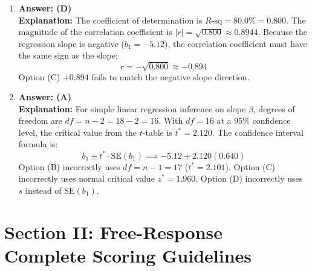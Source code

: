 \begin{enumerate}[leftmargin=1.5em]
  \item \textbf{Answer: (D)} \\
  \textbf{Explanation:} The coefficient of determination is $R\text{-sq} = 80.0\% = 0.800$. The magnitude of the correlation coefficient is $|r| = \sqrt{0.800} \approx 0.8944$. Because the regression slope is negative ($b_1 = -5.12$), the correlation coefficient must have the same sign as the slope:
  \[ r = -\sqrt{0.800} \approx -0.894 \]
  Option (C) $+0.894$ fails to match the negative slope direction.

  \item \textbf{Answer: (A)} \\
  \textbf{Explanation:} For simple linear regression inference on slope $\beta$, degrees of freedom are $df = n - 2 = 18 - 2 = 16$. With $df = 16$ at a 95\% confidence level, the critical value from the $t$-table is $t^* = 2.120$. The confidence interval formula is:
  \[ b_1 \pm t^* \cdot \text{SE}(b_1) \implies -5.12 \pm 2.120(0.640) \]
  Option (B) incorrectly uses $df = n - 1 = 17$ ($t^* = 2.101$). Option (C) incorrectly uses normal critical value $z^* = 1.960$. Option (D) incorrectly uses $s$ instead of $\text{SE}(b_1)$.
\end{enumerate}

\section{Section II: Free-Response Complete Scoring Guidelines}

